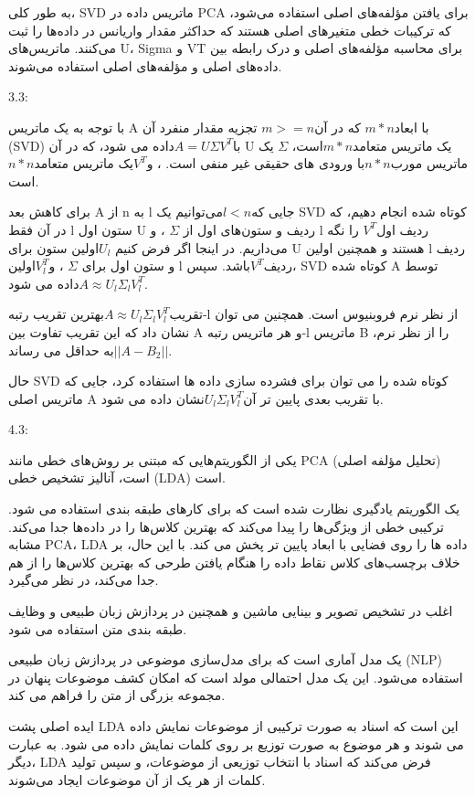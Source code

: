 به طور کلی، SVD ماتریس داده در PCA برای یافتن مؤلفه‌های اصلی استفاده می‌شود، که ترکیبات خطی متغیرهای اصلی هستند که حداکثر مقدار واریانس در داده‌ها را ثبت می‌کنند. ماتریس‌های U، Sigma و VT برای محاسبه مؤلفه‌های اصلی و درک رابطه بین داده‌های اصلی و مؤلفه‌های اصلی استفاده می‌شوند.

3.3:

با توجه به یک ماتریس A با ابعاد$ m* n $ که در آن$ m>= n $ تجزیه مقدار منفرد آن (SVD) با$ A = U\Sigma V^T $داده می شود، که در آن U یک ماتریس متعامد$ m* n $است، $\Sigma $ یک ماتریس مورب$ n* n $با ورودی های حقیقی غیر منفی است. ، و$ V^T $یک ماتریس متعامد$ n* n $ است.

برای کاهش بعد A از n به l جایی که$ l < n $می‌توانیم یک SVD کوتاه شده انجام دهیم، که در آن فقط l ستون‌ اول U ردیف‌ و ستون‌های اول از $ \Sigma $ ، و l ردیف‌ اول$  V^T $ را نگه می‌داریم. در اینجا اگر فرض کنیم $ U_l $اولین  ستون برای U هستند و همچنین اولین l ردیف و ستون اول برای $\Sigma $ ، و$ V^T_l $اولین l ردیف$ V^T $باشد. سپس، SVD کوتاه شده A توسط$ A  \approx U_l\Sigma_lV^T_l $داده می شود.

تقریب$ A  \approx U_l\Sigma_lV^T_l $بهترین تقریب رتبه-l از نظر نرم فروبنیوس است. همچنین می توان نشان داد که این تقریب تفاوت بین A و هر ماتریس رتبه-l ماتریس B را از نظر نرم،$ || A - B_2 || $به حداقل می رساند.

حال  SVD کوتاه شده را می توان برای فشرده سازی داده ها استفاده کرد، جایی که ماتریس اصلی A با تقریب بعدی پایین تر آن$ U_l\Sigma_lV^T_l $نشان داده می شود. 

4.3:

یکی از الگوریتم‌هایی که مبتنی بر روش‌های خطی مانند PCA (تحلیل مؤلفه اصلی) است، آنالیز تشخیص خطی (LDA) است.

 یک الگوریتم یادگیری نظارت شده است که برای کارهای طبقه بندی استفاده می شود. ترکیبی خطی از ویژگی‌ها را پیدا می‌کند که بهترین کلاس‌ها را در داده‌ها جدا می‌کند. مشابه PCA، LDA داده ها را روی فضایی با ابعاد پایین تر پخش می کند. با این حال، بر خلاف  برچسب‌های کلاس نقاط داده را هنگام یافتن طرحی که بهترین کلاس‌ها را از هم جدا می‌کند، در نظر می‌گیرد.

 اغلب در تشخیص تصویر و بینایی ماشین و همچنین در پردازش زبان طبیعی و وظایف طبقه بندی متن استفاده می شود.

 یک مدل آماری است که برای مدل‌سازی موضوعی در پردازش زبان طبیعی (NLP) استفاده می‌شود. این یک مدل احتمالی مولد است که امکان کشف موضوعات پنهان در مجموعه بزرگی از متن را فراهم می کند.

ایده اصلی پشت LDA این است که اسناد به صورت ترکیبی از موضوعات نمایش داده می شوند و هر موضوع به صورت توزیع بر روی کلمات نمایش داده می شود. به عبارت دیگر، LDA فرض می‌کند که اسناد با انتخاب توزیعی از موضوعات، و سپس تولید کلمات از هر یک از آن موضوعات ایجاد می‌شوند.

